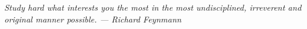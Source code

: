 \chapter*{}
\vfill
\begin{flushright}
    \textit{Study hard what interests you the most in the most undisciplined, irreverent and original manner possible. --- Richard Feynmann}
\end{flushright}
\vspace{1cm}